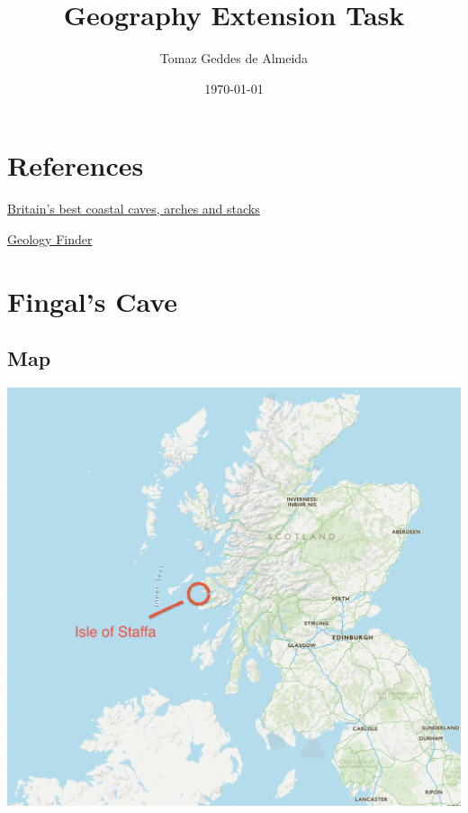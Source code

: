 \documentclass[11pt]{article}
\author{Tomaz Geddes de Almeida}
\date{\today}
\title{Geography Extension Task}
\begin{document}
\maketitle
\tableofcontents


\section{References}
\label{sec:orgb141844}

\href{https://www.countryfile.com/go-outdoors/days-out/britains-best-coastal-caves-arches-and-stacks/}{Britain’s best coastal caves, arches and stacks}

\href{http://mapapps.bgs.ac.uk/geologyofbritain/home.html}{Geology Finder}

\section{Fingal's Cave}
\label{sec:org6aadb39}

\subsection{Map}
\label{sec:orgd535c53}
\begin{center}
\includegraphics[width=.9\linewidth]{Images/isle-of-staffa.png}
\end{center}
\end{document}
